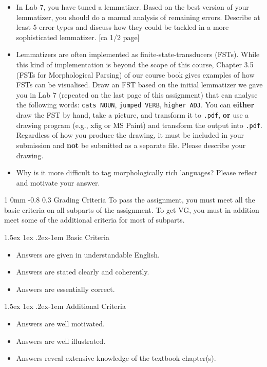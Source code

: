 \documentclass[11pt]{article}
\makeatletter
\renewcommand{\section}{\@startsection
{section}%
{1}%
{0mm}%
{-0.8\baselineskip}%
{0.3\baselineskip}%
{\bfseries\large}}%
\renewcommand{\paragraph}{%
  \@startsection{paragraph}{4}%
  {\z@}{1.5ex \@plus 1ex \@minus .2ex}{-1em}%
  {\normalfont\normalsize\bfseries}%
}\makeatother
\newenvironment{titlemize}[1]{%
    \paragraph{#1}
    \begin{itemize}
        \setlength\itemsep{0pt}}
    {\end{itemize}}
\makeatother
\begin{document}
\begin{itemize}
\item In Lab 7, you have tuned a lemmatizer. Based on the best version
  of your lemmatizer, you should do a manual analysis of remaining
  errors. Describe at least 5 error types and discuss how they could
  be tackled in a more sophisticated lemmatizer. \textcolor{UUred}{[ca
    1/2 page]}
\item Lemmatizers are often implemented as finite-state-transducers
  (FSTs). While this kind of implementation is beyond the scope of
  this course, Chapter 3.5 (FSTs for Morphological Parsing) of our
  course book gives examples of how FSTs can be visualised. Draw an
  FST based on the initial lemmatizer we gave you in Lab 7 (repeated
  on the last page of this assignment) that can analyse the following
  words: \texttt{cats NOUN}, \texttt{jumped VERB}, \texttt{higher
    ADJ}. You can \textbf{either} draw the FST by hand, take a picture, and
  transform it to \texttt{.pdf}, \textbf{or} use a drawing program
  (e.g., xfig or MS Paint) and transform the output into
  \texttt{.pdf}. Regardless of how you produce the drawing, it must be included in your submission and 
  \textbf{not} be submitted as a separate file. Please describe
  your drawing. %
\item Why is it more difficult to tag morphologically rich languages?
  Please reflect and motivate your answer. %
\end{itemize}

\clearpage
\section{Grading Criteria}
To pass the assignment, you must meet all the basic criteria on all
subparts of the assignment.  To get VG, you must in addition meet some
of the additional criteria for most of subparts.

\begin{titlemize}{Basic Criteria}
    \item Answers are given in understandable English.
    \item Answers are stated clearly and coherently.
    \item Answers are essentially correct.
\end{titlemize}
\begin{titlemize}{Additional Criteria}
    \item Answers are well motivated.
    \item Answers are well illustrated.
    \item Answers reveal extensive knowledge of the textbook chapter(s).
\end{titlemize}
\end{document}
